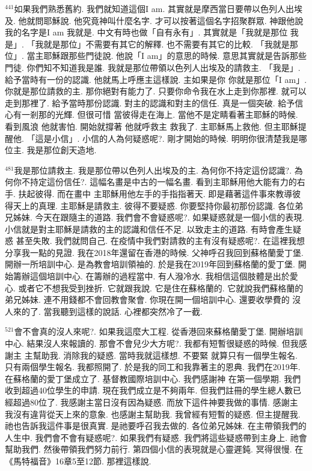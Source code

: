\documentclass{book}
\begin{document}
$^{441}$如果我們熟悉舊約.
我們就知道這個I am.
其實就是摩西當日要帶以色列人出埃及.
他就問耶穌說.
他究竟神叫什麼名字.
才可以按著這個名字招聚群眾.
神跟他說 我的名字是I am 我就是.
中文有時也做「自有永有」.
其實就是「我就是那位 我是」.
「我就是那位」不需要有其它的解釋.
也不需要有其它的比較.
「我就是那位」.
當主耶穌跟那些門徒說.
他說「I am」的意思的時候.
意思其實就是告訴那些門徒.
你們知不知道我是誰.
我就是那位帶領以色列人出埃及的請救主.
「我是」.
給予當時有一份的認識.
他就馬上呼應主這樣說.
主如果是你 你就是那位「I am」.
你就是那位請救的主.
那你絕對有能力了.
只要你命令我在水上走到你那裡.
就可以走到那裡了.
給予當時那份認識.
對主的認識和對主的信任.
真是一個突破.
給予信心有一剎那的光輝.
但很可惜 當彼得走在海上.
當他不是定睛看著主耶穌的時候.
看到風浪 他就害怕.
開始就撐著 他就呼救主 救我了.
主耶穌馬上救他.
但主耶穌提醒他.
「這是小信」.
小信的人為何疑惑呢?.
剛才開始的時候.
明明你很清楚我是哪位主.
我是那位創天造地.

$^{481}$我是那位請救主.
我是那位帶以色列人出埃及的主.
為何你不持定這份認識?.
為何你不持定這份信任?.
這幅名畫是中古的一幅名畫.
看到主耶穌用他大能有力的右手.
扶起彼得.
而在畫中 主耶穌用他左手的手指指著天.
即是藉著這件事來教導彼得天上的真理.
主耶穌是請救主.
彼得不要疑惑.
你要堅持你最初那份認識.
各位弟兄姊妹.
今天在跟隨主的道路.
我們會不會疑惑呢?.
如果疑惑就是一個小信的表現.
小信就是對主耶穌是請救的主的認識和信任不足.
以致走主的道路.
有時會產生疑惑 甚至失敗.
我們就問自己.
在疫情中我們對請救的主有沒有疑惑呢?.
在這裡我想分享我一點的見證.
我在2018年還留在香港的時候.
父神呼召我回到蘇格蘭愛丁堡.
開辦一所培訓中心.
是為教會培訓領袖的.
於是我在2019年回到蘇格蘭的愛丁堡.
開始籌辦這個培訓中心.
在籌辦的過程當中.
有人潑冷水.
我相信這個肢體是出於愛心.
或者它不想我受到挫折.
它就跟我說.
它是住在蘇格蘭的.
它就說我們蘇格蘭的弟兄姊妹.
連不用錢都不會回教會聚會.
你現在開一個培訓中心.
還要收學費的 沒人來的了.
當我聽到這樣的說話.
心裡都突然冷了一截.

$^{521}$會不會真的沒人來呢?.
如果我這麼大工程.
從香港回來蘇格蘭愛丁堡.
開辦培訓中心.
結果沒人來報讀的.
那會不會兒少大方呢?.
我都有短暫很疑惑的時候.
但我感謝主 主幫助我.
消除我的疑惑.
當時我就這樣想.
不要緊 就算只有一個學生報名.
只有兩個學生報名.
我都照開了.
於是我的同工和我靠著主的恩典.
我們在2019年.
在蘇格蘭的愛丁堡成立了.
基督教國際培訓中心.
我們感謝神 在第一個學期.
我們收到超過40位學生的申請.
現在我們成立是不夠兩年.
但我們註冊的學生總人數已經超過80位了.
我感謝主當日沒有因為疑惑.
而放下這件神要我做的事情.
感謝主 我沒有違背從天上來的意象.
也感謝主幫助我.
我曾經有短暫的疑惑.
但主提醒我.
祂也告訴我這件事是很真實.
是祂要呼召我去做的.
各位弟兄姊妹.
在主帶領我們的人生中.
我們會不會有疑惑呢?.
如果我們有疑惑.
我們將這些疑惑帶到主身上.
祂會幫助我們.
然後帶領我們努力前行.
第四個小信的表現就是心靈遲鈍.
冥得很慢.
在《馬特福音》16章5至12節.
那裡這樣說.
\end{document}
